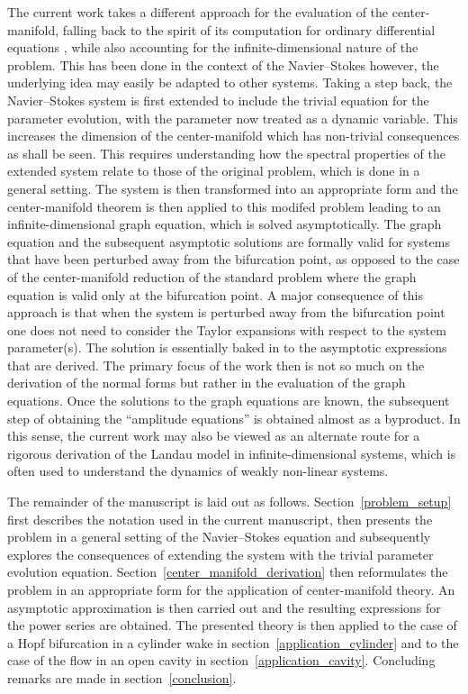 The current work takes a different approach for the evaluation of the center-manifold, falling back to the spirit of its computation for ordinary differential equations \citep{wiggins03}, while also accounting for the infinite-dimensional nature of the problem. This has been done in the context of the Navier--Stokes however, the underlying idea may easily be adapted to other systems. Taking a step back, the Navier--Stokes system is first extended to include the trivial equation for the parameter evolution, with the parameter now treated as a dynamic variable. This increases the dimension of the center-manifold which has non-trivial consequences as shall be seen. This requires understanding how the spectral properties of the extended system relate to those of the original problem, which is done in a general setting. The system is then transformed into an appropriate form and the center-manifold theorem is then applied to this modifed problem leading to an infinite-dimensional graph equation, which is solved asymptotically. The graph equation and the subsequent asymptotic solutions are formally valid for systems that have been perturbed away from the bifurcation point, as opposed to the case of the center-manifold reduction of the standard problem where the graph equation is valid only at the bifurcation point. A major consequence of this approach is that when the system is perturbed away from the bifurcation point one does not need to consider the Taylor expansions with respect to the system parameter(s). The solution is essentially baked in to the asymptotic expressions that are derived. The primary focus of the work then is not so much on the derivation of the normal forms but rather in the evaluation of the graph equations. Once the solutions to the graph equations are known, the subsequent step of obtaining the ``amplitude equations'' is obtained almost as a byproduct. In this sense, the current work may also be viewed as an alternate route for a rigorous derivation of the Landau model \citep{landau_52} in infinite-dimensional systems, which is often used to understand the dynamics of weakly non-linear systems. 

The remainder of the manuscript is laid out as follows. Section~\ref{problem_setup} first describes the notation used in the current manuscript, then presents the problem in a general setting of the Navier--Stokes equation and subsequently explores the consequences of extending the system with the trivial parameter evolution equation. Section~\ref{center_manifold_derivation} then reformulates the problem in an appropriate form for the application of center-manifold theory. An asymptotic approximation is then carried out and the resulting expressions for the power series are obtained. The presented theory is then applied to the case of a Hopf bifurcation in a cylinder wake in section~\ref{application_cylinder} and to the case of the flow in an open cavity in section~\ref{application_cavity}. Concluding remarks are made in section~\ref{conclusion}.










